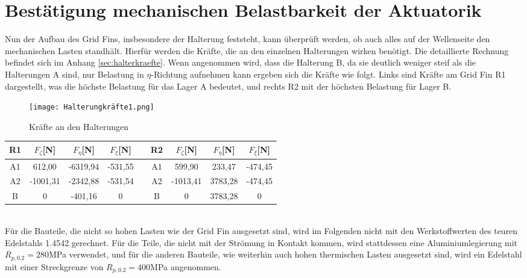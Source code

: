 \section{Bestätigung mechanischen Belastbarkeit der Aktuatorik}
Nun der Aufbau des Grid Fins, insbesondere der Halterung feststeht, kann überprüft werden, ob auch alles auf der Wellenseite den mechanischen Lasten standhält. Hierfür werden die Kräfte, die an den einzelnen Halterungen wirken benötigt. Die detaillierte Rechnung befindet sich im Anhang \ref{sec:halterkraefte}. Wenn angenommen wird, dass die Halterung B, da sie deutlich weniger steif als die Halterungen A sind, nur Belastung in $\eta$-Richtung aufnehmen kann ergeben sich die Kräfte wie folgt. Links sind Kräfte am Grid Fin R1 dargestellt, was die höchste Belastung für das Lager A bedeutet, und rechts R2 mit der höchsten Belastung für Lager B.
\begin{figure}[h] 
	\centering
	\texttt{[image: Halterungkräfte1.png]}
	\caption{Kräfte an den Halterungen}
\end{figure}
\begin{table}[h] 
	\centering 
	\begin{tabular}{c|c|c|cc||c|c|c|c} 
		\textbf{R1}&$F_{\zeta}$[N]&$F_\eta$[N]&$F_\xi$[N]&&\textbf{R2}&$F_{\zeta}$[N]&$F_\eta$[N]&$F_\xi$[N]\\ 
		\hline 
		A1& 612,00&-6319,94&-531,55&&A1&599,90&233,47&-474,45\\
		A2&-1001,31&-2342,88&-531,54&&A2&-1013,41&3783,28&-474,45\\
		B&0&-401,16&0&&B&0&3783,28&0\\
	\end{tabular}
\end{table} \\
Für die Bauteile, die nicht so hohen Lasten wie der Grid Fin ausgesetzt sind, wird im Folgenden nicht mit den Werkstoffwerten des teuren Edelstahls 1.4542 gerechnet. Für die Teile, die nicht mit der Strömung in Kontakt kommen, wird stattdessen eine Aluminiumlegierung mit $R_{p,0.2} = 280$MPa verwendet, und für die anderen Bauteile, wie weiterhin auch hohen thermischen Lasten ausgesetzt sind, wird ein Edelstahl mit einer Streckgrenze von $R_{p,0.2} = 400$MPa angenommen.
